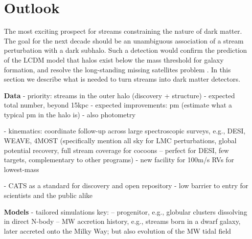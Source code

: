 \documentclass[final,5p,times,twocolumn,authoryear]{elsarticle}
\begin{document}
\section{Outlook}
\label{sec:outlook}

The most exciting prospect for streams constraining the nature of dark matter.
The goal for the next decade should be an unambiguous association of a stream perturbation with a dark subhalo.
Such a detection would confirm the prediction of the LCDM model that halos exist below the mass threshold for galaxy formation, and resolve the long-standing missing satellites problem \citep{klypin:1999}.
In this section we describe what is needed to turn streams into dark matter detectors.


\textbf{Data}
- priority: streams in the outer halo (discovery + structure)
- expected total number, beyond 15kpc
- expected improvements: pm (estimate what a typical pm in the halo is)
- also photometry

- kinematics: coordinate follow-up across large spectroscopic surveys, e.g., DESI, WEAVE, 4MOST (specifically mention all sky for LMC perturbations, global potential recovery, full stream coverage for cocoons -- perfect for DESI, few targets, complementary to other programs)
- new facility for 100m/s RVs for lowest-mass

- CATS as a standard for discovery and open repository
- low barrier to entry for scientists and the public alike


\textbf{Models}
- tailored simulations key:
-- progenitor, e.g., globular clusters dissolving in direct N-body
-- MW accretion history, e.g., streams born in a dwarf galaxy, later accreted onto the Milky Way; but also evolution of the MW tidal field
\end{document}
